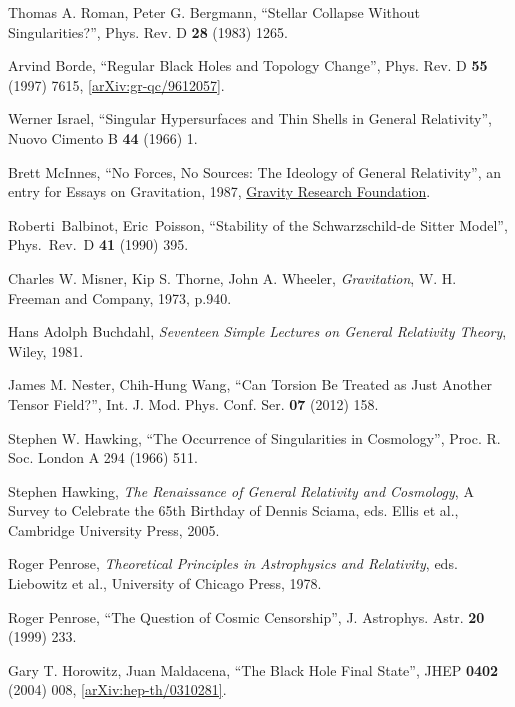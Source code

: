 \documentclass[12pt]{article}
\newcommand{\2}{$^2$}
\newcommand{\3}{$^3$}
\newcommand{\4}{$_4$}
\newcommand{\5}{$_5$}
\begin{document}
\begin{thebibliography}{400}
Thomas A. Roman, Peter G. Bergmann, ``Stellar Collapse Without Singularities?'', Phys. Rev. D \textbf{28} (1983) 1265.

Arvind Borde, ``Regular Black Holes and Topology Change'', Phys. Rev. D \textbf{55} (1997) 7615, \href{http://arxiv.org/abs/gr-qc/9612057}{[arXiv:gr-qc/9612057]}.
	
Werner Israel, ``Singular Hypersurfaces and Thin Shells in General Relativity'', Nuovo Cimento B \textbf{44} (1966) 1.
	
Brett McInnes, ``No Forces, No Sources: The Ideology of General Relativity'', an entry for Essays on Gravitation, 1987, \href{http://www.gravityresearchfoundation.org/pdf/awarded/1987/mcinnes.pdf}{Gravity Research Foundation}.

  Roberti~Balbinot, Eric~Poisson,
  ``Stability of the Schwarzschild-de Sitter Model'', Phys.\ Rev.\ D {\bf 41} (1990) 395.
	
Charles W. Misner, Kip S. Thorne, John A. Wheeler, \emph{Gravitation}, W. H. Freeman and Company, 1973, p.940.

	
Hans Adolph Buchdahl, \emph{Seventeen Simple Lectures on General Relativity Theory}, Wiley, 1981.
	
	
James M. Nester, Chih-Hung Wang, ``Can Torsion Be Treated as Just Another Tensor Field?'', Int. J. Mod. Phys. Conf. Ser. \textbf{07} (2012) 158.

Stephen W. Hawking, ``The Occurrence of Singularities in Cosmology'', Proc. R. Soc. London A 294 (1966) 511.

Stephen Hawking, \emph{The Renaissance of General Relativity and Cosmology}, A Survey to Celebrate the 65th Birthday of Dennis Sciama, eds. Ellis et al., Cambridge University Press, 2005.

Roger Penrose, \emph{Theoretical Principles in Astrophysics and Relativity}, eds. Liebowitz et al., University of Chicago Press, 1978.

Roger Penrose, ``The Question of Cosmic Censorship'', J. Astrophys. Astr. \textbf{20} (1999) 233.

Gary T. Horowitz, Juan Maldacena, ``The Black Hole Final State'', JHEP \textbf{0402} (2004) 008, \href{http://arxiv.org/abs/hep-th/0310281}{[arXiv:hep-th/0310281]}.


\end{thebibliography}
\end{document}
